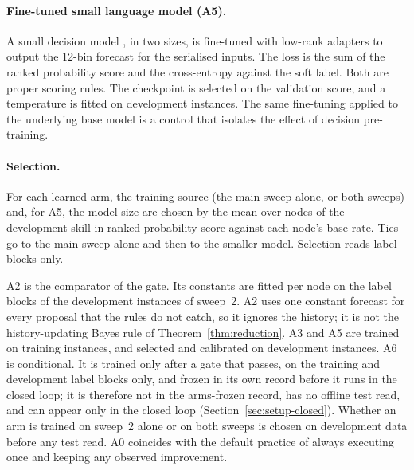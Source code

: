 \paragraph{Fine-tuned small language model (A5).}
A small decision model \citep{kev2026}, in two sizes, is fine-tuned with low-rank adapters to output the 12-bin forecast for the serialised inputs. The loss is the sum of the ranked probability score and the cross-entropy against the soft label. Both are proper scoring rules. The checkpoint is selected on the validation score, and a temperature is fitted on development instances. The same fine-tuning applied to the underlying base model \citep{qwen35} is a control that isolates the effect of decision pre-training. 

\paragraph{Selection.}
For each learned arm, the training source (the main sweep alone, or both sweeps) and, for A5, the model size are chosen by the mean over nodes of the development skill in ranked probability score against each node's base rate. Ties go to the main sweep alone and then to the smaller model. Selection reads label blocks only.

A2 is the comparator of the gate. Its constants are fitted per node on the label blocks of the development instances of sweep~2. A2 uses one constant forecast for every proposal that the rules do not catch, so it ignores the history; it is not the history-updating Bayes rule of Theorem~\ref{thm:reduction}. A3 and A5 are trained on training instances, and selected and calibrated on development instances. A6 is conditional. It is trained only after a gate that passes, on the training and development label blocks only, and frozen in its own record before it runs in the closed loop; it is therefore not in the arms-frozen record, has no offline test read, and can appear only in the closed loop (Section~\ref{sec:setup-closed}). Whether an arm is trained on sweep~2 alone or on both sweeps is chosen on development data before any test read. A0 coincides with the default practice of always executing once and keeping any observed improvement. 

